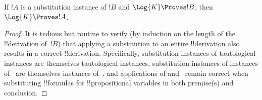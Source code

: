 \documentclass[../../../include/open-logic-section]{subfiles}
\begin{document}
\begin{prop}
  If $!A$ is a substitution instance of $!B$ and $\Log{K} \Proves !B$,
  then $\Log{K} \Proves !A$.
\end{prop}

\begin{proof}
  It is tedious but routine to verify (by induction on the length of
  the !!{derivation} of~$!B$) that applying a substitution to an
  entire !!{derivation} also results in a correct
  !!{derivation}. Specifically, substitution instances of tautological
  instances are themselves tautological instances, substitution
  instances of instances of~
  are themselves instances of~, and applications of \MP{} and~\Nec{} remain correct
  when substituting !!{formula}s for !!{propositional variable}s in
  both premise(s) and conclusion.
\end{proof}
\end{document}
